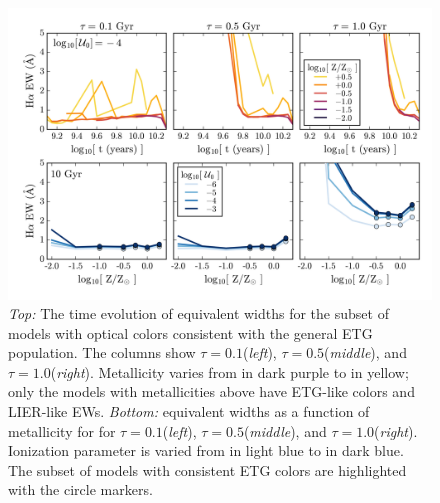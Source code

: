 \begin{figure}
  \begin{center}
    \includegraphics[width=\linewidth]{figs/f13.png}
    \caption{\emph{Top:} The time evolution of \ha equivalent widths for the subset of models with optical colors consistent with the general ETG population. The columns show $\tau=0.1$\Gyr (\emph{left}),  $\tau=0.5$\Gyr (\emph{middle}), and $\tau=1.0$\Gyr (\emph{right}). Metallicity varies from  in dark purple to  in yellow; only the models with metallicities above  have ETG-like colors and LIER-like EWs. \emph{Bottom:} \ha equivalent widths as a function of metallicity for for $\tau=0.1$\Gyr (\emph{left}),  $\tau=0.5$\Gyr (\emph{middle}), and $\tau=1.0$\Gyr (\emph{right}). Ionization parameter is varied from  in light blue to  in dark blue. The subset of models with consistent ETG colors are highlighted with the circle markers.}
    \label{fig:linearEW}
  \end{center}
\end{figure}



